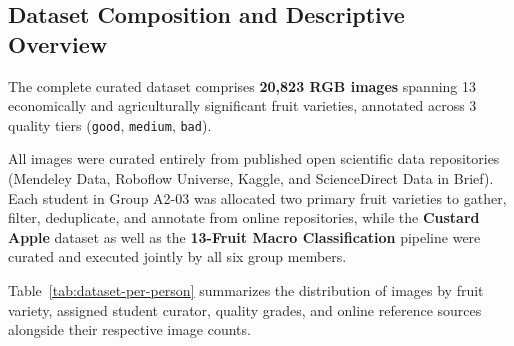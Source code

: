\documentclass[11pt,a4paper]{article}
\begin{document}
\subsection{Dataset Composition and Descriptive Overview}
The complete curated dataset comprises \textbf{20,823 RGB images} spanning 13 economically and agriculturally significant fruit varieties, annotated across 3 quality tiers (\texttt{good}, \texttt{medium}, \texttt{bad}). 

All images were curated entirely from published open scientific data repositories (Mendeley Data, Roboflow Universe, Kaggle, and ScienceDirect Data in Brief). Each student in Group A2-03 was allocated two primary fruit varieties to gather, filter, deduplicate, and annotate from online repositories, while the \textbf{Custard Apple} dataset as well as the \textbf{13-Fruit Macro Classification} pipeline were curated and executed jointly by all six group members.

Table~\ref{tab:dataset-per-person} summarizes the distribution of images by fruit variety, assigned student curator, quality grades, and online reference sources alongside their respective image counts.
\end{document}

